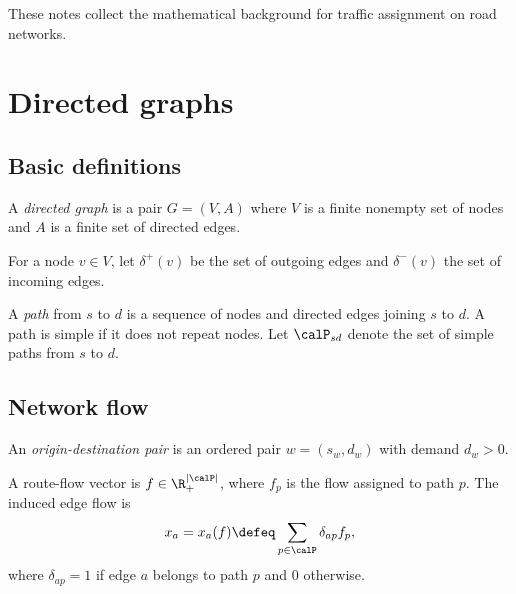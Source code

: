 
These notes collect the mathematical background for traffic assignment on road networks.

\section{Directed graphs}

\subsection{Basic definitions}


\begin{definition}
A \emph{directed graph} is a pair $G = (V, A)$ where $V$ is a finite nonempty set of nodes and $A$ is a finite set of directed edges.
\end{definition}

\begin{notation}
For a node $v \in V$, let $\delta^+(v)$ be the set of outgoing edges and $\delta^-(v)$ the set of incoming edges.
\end{notation}

\begin{definition}[Path]
A \emph{path} from $s$ to $d$ is a sequence of nodes and directed edges joining $s$ to $d$. A path is simple if it does not repeat nodes. Let $\calP_{sd}$ denote the set of simple paths from $s$ to $d$.
\end{definition}

\subsection{Network flow}

\begin{definition}
An \emph{origin-destination pair} is an ordered pair $w = (s_w, d_w)$ with demand $d_w > 0$.
\end{definition}

\begin{definition}
A route-flow vector is $f \in \R^{|\calP|}_+$, where $f_p$ is the flow assigned to path $p$. The induced edge flow is
\[
x_a = x_a(f) \defeq \sum_{p \in \calP} \delta_{ap} f_p,
\]
where $\delta_{ap}=1$ if edge $a$ belongs to path $p$ and $0$ otherwise.
\end{definition}

